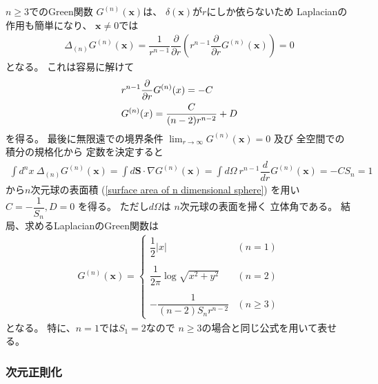 $n \ge 3$でのGreen関数
$G^{(n)}(\bm{x})$は、
$\delta(\bm{x})$が$r$にしか依らないため
Laplacianの作用も簡単になり、
$\bm{x} \neq 0$では
\begin{align}
    \Delta_{(n)}
    G^{(n)}(\bm{x})
=
    \dfrac{1}{r^{n-1}}
    \dfrac{\partial}{\partial r}
    \left(
        r^{n-1}
        \dfrac{\partial}{\partial r}
        G^{(n)}(\bm{x})
    \right)
= 0
\end{align}
となる。
これは容易に解けて
\begin{align}
    &r^{n-1}
    \dfrac{\partial}{\partial r}
    G^{(n)}(x)
=
    - C
\notag\\
    &G^{(n)}(x)
=
    \dfrac{C}{(n - 2) r^{n-2}}
    + D
\label{n dim green func of laplace (const unfixed)}
\end{align}
を得る。
最後に無限遠での境界条件
$\lim_{r \to \infty}
    G^{(n)}(\bm{x}) = 0$
及び
全空間での積分の規格化から
定数を決定すると
\begin{align}
    \int d^n x\ 
    \Delta_{(n)}
    G^{(n)}(\bm{x})
=
    \int d \bm{S}
        \cdot
        \nabla
    G^{(n)}(\bm{x})
=
    \int d \Omega\ 
        r^{n-1}
        \dfrac{d}{dr}
    G^{(n)}(\bm{x})
=
    - C S_n
=    1
\end{align}
から$n$次元球の表面積
(\ref{surface area of n dimensional sphere})
を用い
$C = - \dfrac{1}{S_n}, D = 0$
を得る。
ただし$d \Omega$は
$n$次元球の表面を掃く
立体角である。
結局、求めるLaplacianのGreen関数は
\begin{align}
    G^{(n)}(\bm{x})
=
    \begin{cases}
        \dfrac{1}{2}|x|
    &(n = 1)
    \\
    \\
        \dfrac{1}{2 \pi}
        \log \sqrt{x^2 + y^2}    
    &(n = 2)
    \\
    \\
        -
        \dfrac{1}{(n - 2) S_n r^{n-2}}
    &(n \ge 3)
    \end{cases}
\label{green function of n dim laplacian}
\end{align}
となる。
特に、$n = 1$では$S_1 = 2$なので
$n \ge 3$の場合と同じ公式を用いて表せる。

\subsubsection{次元正則化}

